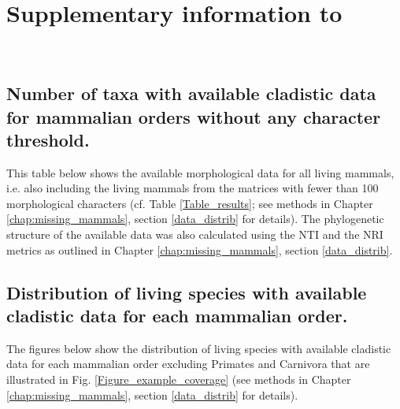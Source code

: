 %
%

\chapter{Supplementary information to }

\label{chap:Appendix_missing_mammals}

\bigskip
\medskip
\begin{center}

 \\
\bigskip
\end{center}


\section{Number of taxa with available cladistic data for mammalian orders without any character threshold.}
This table below shows the available morphological data for all living mammals, i.e. also including the living mammals from the matrices with fewer than 100 morphological characters (cf. Table \ref{Table_results}; see methods in Chapter \ref{chap:missing_mammals}, section \ref{data_distrib} for details).
The phylogenetic structure of the available data was also calculated using the NTI and the NRI metrics as outlined in Chapter \ref{chap:missing_mammals}, section \ref{data_distrib}.



\section{Distribution of living species with available cladistic data for each mammalian order.}

The figures below show the distribution of living species with available cladistic data for each mammalian order excluding Primates and Carnivora that are illustrated in Fig. \ref{Figure_example_coverage} (see methods in Chapter \ref{chap:missing_mammals}, section \ref{data_distrib} for details).

